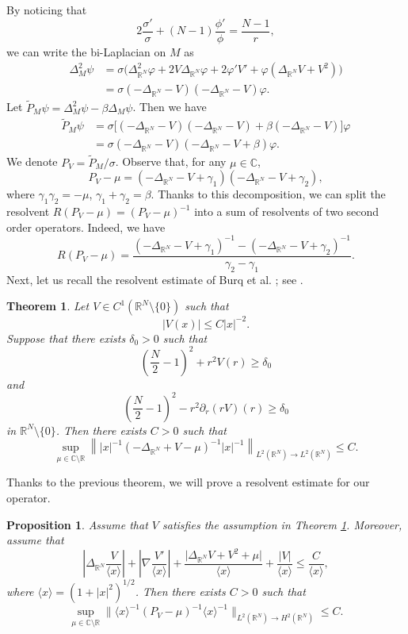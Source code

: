 \documentclass[10pt,leqno]{amsart}
\newtheorem{thm}{Theorem}[section]
\newtheorem{prop}{Proposition}[section]
\numberwithin{equation}{section}
\newcommand{\field}[1]{\mathbb{#1}}
\newcommand{\R}{\field{R}}          		%
\begin{document}
By noticing that 
\[
2\frac{\sigma'}{\sigma}+ (N-1) \frac{\phi'}{\phi}=\frac{N-1}{r},
\]
we can write the bi-Laplacian on $M$ as
\begin{align*}
\Delta^2_M \psi &= \sigma \big(\Delta_{\R^N}^2 \varphi +2V \Delta_{\R^N} \varphi +2\varphi ' V' +\varphi (\Delta_{\R^N} V +V^2)\big)\\
&=\sigma (-\Delta_{\R^N} -V ) (-\Delta_{\R^N} -V) \varphi.
\end{align*}
Let $\tilde{P}_M \psi= \Delta^2_M \psi -\beta \Delta_M \psi $. Then we have
\begin{align*}
\tilde{P}_M \psi &= \sigma \big[ (-\Delta_{\R^N} -V ) (-\Delta_{\R^N} -V) +\beta (-\Delta_{\R^N} -V) \big] \varphi\\
&=\sigma  (-\Delta_{\R^N} - V) (-\Delta_{\R^N} -V +\beta) \varphi.
\end{align*}
We denote $P_V= \tilde{P}_M /\sigma$. Observe that, for any $\mu \in \mathbb{C}$, 
$$P_V- \mu= (-\Delta_{\R^N} -V +\gamma_1) (-\Delta_{\R^N} -V +\gamma_2),$$
where $\gamma_1 \gamma_2= -\mu$, $\gamma_1 +\gamma_2 = \beta$. Thanks to this decomposition, we can split the resolvent $R(P_V-\mu)=(P_V-\mu)^{-1}$ into a sum of resolvents of two second order operators. Indeed, we have
\begin{equation}
\label{decom}
R(P_V-\mu) =\dfrac{ (-\Delta_{\R^N} -V +\gamma_1)^{-1} - (-\Delta_{\R^N} -V + \gamma_2)^{-1}}{\gamma_2 -\gamma_1} .
\end{equation}
Next, let us recall the resolvent estimate of 
Burq et al. \cite[Theorem 2.1]{BPST}; see  \cite[Theorem 3.1]{BaDyweight}.
\begin{thm} \label{thmbd}
Let $V\in C^1 (\R^N \setminus \{0\})$ such that
$$|V(x)|\leq C |x|^{-2}.$$
Suppose that there exists $\delta_0>0$ such that
\[
\left(\frac{N}{2} -1\right)^2 +r^2 V(r) \geq \delta_0
\]
and
\[
\left(\frac{N}{2} -1\right)^2 - r^2 \partial_r (rV)(r) \geq \delta_0
\]
in $\R^N \setminus \{0\}$.
Then there exists $C>0$ such that
$$\sup_{\mu \in \mathbb{C} \setminus \R } \left\| |x|^{-1} (-\Delta_{\R^N} +V -\mu)^{-1} |x|^{-1}\right\|_{L^2 (\R^N) \rightarrow L^2 (\R^N)}\leq C.$$
\end{thm}

Thanks to the previous theorem, we will prove a  resolvent estimate for our operator.

\begin{prop}
Assume that $V$ satisfies the assumption in Theorem \ref{thmbd}. Moreover, assume that
\begin{equation}
\label{hyppot}
\left|\Delta_{\R^N} \frac{V}{\langle x\rangle}\right| +\left|\nabla\frac{V'}{\langle x\rangle}\right|+\dfrac{ \big| \Delta_{\R^N} V +V^2 +\mu \big|}{\langle x \rangle} + \frac{|V|}{\langle x\rangle} \leq \frac{C}{\langle x \rangle},
\end{equation}
where $\langle x\rangle =(1+|x|^2)^{1/2}$.
Then there exists $C>0$ such that
$$\sup_{\mu \in \mathbb{C} \setminus \R} \big\| \langle x\rangle^{-1}  (P_V -\mu)^{-1} \langle x\rangle ^{-1} \big\|_{L^2 (\R^N) \rightarrow H^2 (\R^N)}\leq C. $$
\end{prop}
\end{document}
